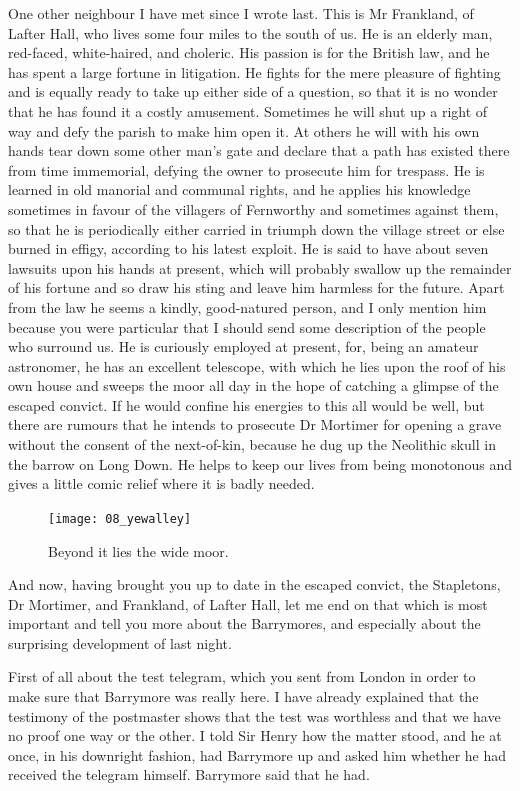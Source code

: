 \documentclass[paper=a5,BCOR=7mm,twoside,DIV=calc,12pt,usegeometry,openany,chapterprefix,endperiod,headings=big]{scrbook} %
\begin{document}
One other neighbour I have met since I wrote last. This is Mr Frankland, of Lafter Hall, who lives some four miles to the south of us. He is an elderly man, red-faced, white-haired, and choleric. His passion is for the British law, and he has spent a large fortune in litigation. He fights for the mere pleasure of fighting and is equally ready to take up either side of a question, so that it is no wonder that he has found it a costly amusement. Sometimes he will shut up a right of way and defy the parish to make him open it. At others he will with his own hands tear down some other man's gate and declare that a path has existed there from time immemorial, defying the owner to prosecute him for trespass. He is learned in old manorial and communal rights, and he applies his knowledge sometimes in favour of the villagers of Fernworthy and sometimes against them, so that he is periodically either carried in triumph down the village street or else burned in effigy, according to his latest exploit. He is said to have about seven lawsuits upon his hands at present, which will probably swallow up the remainder of his fortune and so draw his sting and leave him harmless for the future. Apart from the law he seems a kindly, good-natured person, and I only mention him because you were particular that I should send some description of the people who surround us. He is curiously employed at present, for, being an amateur astronomer, he has an excellent telescope, with which he lies upon the roof of his own house and sweeps the moor all day in the hope of catching a glimpse of the escaped convict. If he would confine his energies to this all would be well, but there are rumours that he intends to prosecute Dr Mortimer for opening a grave without the consent of the next-of-kin, because he dug up the Neolithic skull in the barrow on Long Down. He helps to keep our lives from being monotonous and gives a little comic relief where it is badly needed.

\begin{figure}[h!]
\centering
\texttt{[image: 08\_yewalley]}
\caption{Beyond it lies the wide moor.}
\end{figure}

And now, having brought you up to date in the escaped convict, the Stapletons, Dr Mortimer, and Frankland, of Lafter Hall, let me end on that which is most important and tell you more about the Barrymores, and especially about the surprising development of last night.

First of all about the test telegram, which you sent from London in order to make sure that Barrymore was really here. I have already explained that the testimony of the postmaster shows that the test was worthless and that we have no proof one way or the other. I told Sir Henry how the matter stood, and he at once, in his downright fashion, had Barrymore up and asked him whether he had received the telegram himself. Barrymore said that he had.
\end{document}
